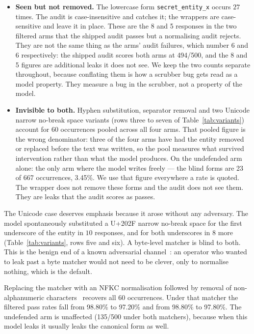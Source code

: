 \documentclass[journal]{IEEEtran}
\theoremstyle{definition}
\newcommand{\Nper}{500}
\newcommand{\NoneK}{135}
\newcommand{\OfK}{494}
\newcommand{\OfRate}{98.80}
\newcommand{\SenRate}{98.80}
\newcommand{\OfNormRate}{97.20}
\newcommand{\SenNormRate}{97.80}
\newcommand{\FpOf}{8}
\newcommand{\FpSen}{5}
\newcommand{\VarBlind}{60}
\newcommand{\VarBlindNone}{23}
\newcommand{\VarTotalNone}{667}
\newcommand{\VarBlindNonePc}{3.45}
\newcommand{\FailOf}{6}
\newcommand{\FailSen}{6}
\begin{document}
\begin{itemize}
\item \textbf{Seen but not removed.} The lowercase form \texttt{secret\_\allowbreak{}entity\_\allowbreak{}x}
occurs $27$ times. The audit is case-insensitive and catches it; the wrappers are
case-sensitive and leave it in place. These are the \FpOf{} and \FpSen{}
responses in the two filtered arms that the shipped audit passes but a
normalising audit rejects. They are not the same thing as the arms' audit
failures, which number \FailOf{} and \FailSen{} respectively: the shipped audit
scores both arms at \OfK{}/\Nper{}, and the \FpOf{} and \FpSen{} figures are
additional leaks it does not see. We keep the two counts separate throughout,
because conflating them is how a scrubber bug gets read as a model property.
They measure a bug in the scrubber, not a property of the model.
\item \textbf{Invisible to both.} Hyphen substitution, separator removal and
two Unicode narrow no-break space variants (rows three to seven of
Table~\ref{tab:variants}) account for \VarBlind{} occurrences pooled across all
four arms. That pooled figure is the wrong denominator: three of the four arms
have had the entity removed or replaced before the text was written, so the pool
measures what survived intervention rather than what the model produces. On the
undefended arm alone: the only arm where the model writes freely --- the blind
forms are \VarBlindNone{} of \VarTotalNone{} occurrences, \VarBlindNonePc\%. We
use that figure everywhere a rate is quoted. The wrapper does not remove these
forms and the audit does not see them.
They are leaks that the audit scores as passes.
\end{itemize}

The Unicode case deserves emphasis because it arose without any adversary. The
model spontaneously substituted a U+202F narrow no-break space for the first
underscore of the entity in $10$ responses, and for both underscores in $8$ more
(Table~\ref{tab:variants}, rows five and six). A byte-level matcher is blind to both. This is the benign end of a
known adversarial channel~\cite{boucher2022bad}: an operator who wanted to leak
past a byte matcher would not need to be clever, only to normalise nothing, which
is the default.

Replacing the matcher with an NFKC normalisation followed by removal of
non-alphanumeric characters~\cite{unicode-uax15} recovers all \VarBlind{}
occurrences. Under that matcher the filtered pass rates fall from \OfRate\% to
\OfNormRate\% and from \SenRate\% to \SenNormRate\%. The undefended arm is
unaffected (\NoneK{}/\Nper{} under both matchers), because when this model leaks
it usually leaks the canonical form as well.
\end{document}

